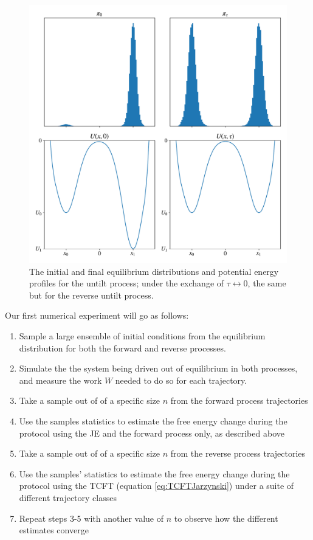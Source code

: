 \documentclass[paper=a4, fontsize=10pt]{article} %
\numberwithin{equation}{section} %
\numberwithin{figure}{section} %
\numberwithin{table}{section} %
\begin{document}
\begin{figure}[H]
\centering
\includegraphics[width=.6\columnwidth, trim=0 0 0 0, clip]{untilt.pdf}
\caption{The initial and final equilibrium distributions and potential energy profiles for the untilt process; under the exchange of $\tau \leftrightarrow 0$, the same but for the reverse untilt process.}
\label{fig:Untilt}
\end{figure}


Our first numerical experiment will go as follows:
\begin{enumerate}
\item Sample a large ensemble of initial conditions from the equilibrium distribution for both the forward and reverse processes.
\item Simulate the the system being driven out of equilibrium in both processes, and measure the work $W$ needed to do so for each trajectory. 
\item Take a sample out of of a specific size $n$ from the forward process trajectories
\item Use the samples statistics to estimate the free energy change during the protocol using the JE and the forward process only, as described above
\item Take a sample out of of a specific size $n$ from the reverse process trajectories
\item Use the samples' statistics to estimate the free energy change during the protocol using the TCFT (equation \ref{eq:TCFTJarzynski}) under a suite of different trajectory classes
\item Repeat steps 3-5 with another value of $n$ to observe how the different estimates converge
\end{enumerate}
\end{document}
